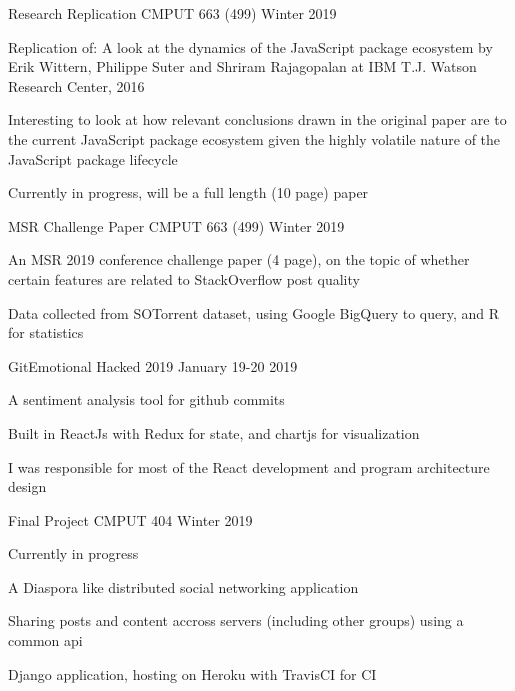 
\begin{cventries}
  \cventry
    {}
    {Research Replication}
    {CMPUT 663 (499)}
    {Winter 2019}
    {
      \begin{cvitems}
      \item {Replication of: A look at the dynamics of the JavaScript package ecosystem by Erik Wittern, Philippe Suter 
        and Shriram Rajagopalan at IBM T.J. Watson Research Center, 2016}
      \item {Interesting to look at how relevant conclusions drawn in the original paper are to the current JavaScript package 
        ecosystem given the highly volatile nature of the JavaScript package lifecycle}
      \item {Currently in progress, will be a full length (10 page) paper}
      \end{cvitems}
    }

  \cventry
    {}
    {MSR Challenge Paper}
    {CMPUT 663 (499)}
    {Winter 2019}
    {
      \begin{cvitems} %
      \item {An MSR 2019 conference challenge paper (4 page), on the topic of whether certain features are
        related to StackOverflow post quality}
      \item {Data collected from SOTorrent dataset, using Google BigQuery to query, and R for statistics}
      \end{cvitems}
    }

  \cventry
    {}
    {GitEmotional}
    {Hacked 2019}
    {January 19-20 2019}
    {
      \begin{cvitems}
      \item {A sentiment analysis tool for github commits}
      \item {Built in ReactJs with Redux for state, and chartjs for visualization}
      \item {I was responsible for most of the React development and program architecture design}
      \end{cvitems}
    }

  \cventry
    {}
    {Final Project}
    {CMPUT 404}
    {Winter 2019}
    {
      \begin{cvitems}
      \item Currently in progress
      \item A Diaspora like distributed social networking application
      \item Sharing posts and content accross servers (including other groups) using a common api
      \item Django application, hosting on Heroku with TravisCI for CI
      \end{cvitems}
    }


\end{cventries}

